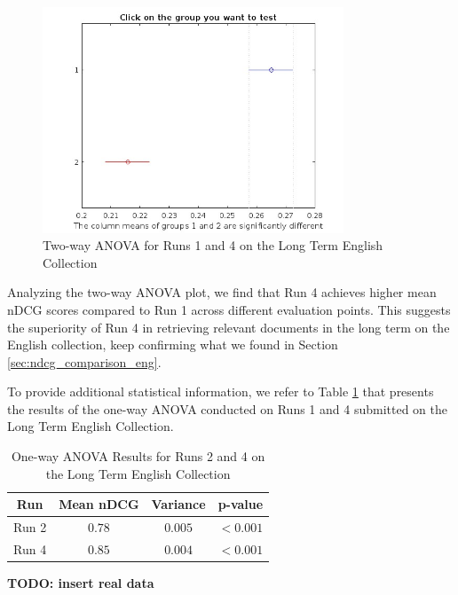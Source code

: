\begin{figure}[!h]
\centering
\includegraphics[width=0.8\textwidth]{figure/StatisticalAnalysis/AnovaTwoWay/LT_EN.jpg}
\caption{Two-way ANOVA for Runs 1 and 4 on the Long Term English Collection}
\label{fig:lt_anova_eng}
\end{figure}

Analyzing the two-way \ac{ANOVA} plot, we find that Run 4 achieves higher mean \ac{nDCG} scores compared to Run 1 across different evaluation points. 
This suggests the superiority of Run 4 in retrieving relevant documents in the long term on the English collection, keep confirming what we found in Section \ref{sec:ndcg_comparison_eng}. 

To provide additional statistical information, we refer to Table \ref{table:lt_anova_eng} that presents the results of the one-way \ac{ANOVA} conducted on Runs 1 and 4 submitted on the Long Term English Collection.

\begin{table}[!h]
\centering
\caption{One-way \ac{ANOVA} Results for Runs 2 and 4 on the Long Term English Collection}
\label{table:lt_anova_eng}
\begin{tabular}{cccc}
\toprule
\textbf{Run} & \textbf{Mean nDCG} & \textbf{Variance} & \textbf{p-value} \\
\midrule
Run 2 & $0.78$ & $0.005$ & $<0.001$ \\
Run 4 & $0.85$ & $0.004$ & $<0.001$ \\
\bottomrule
\end{tabular}
\end{table}

\begin{center}
    \textbf{TODO: insert real data}
\end{center}

